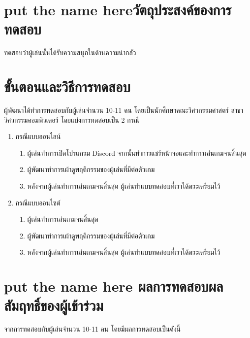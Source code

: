 \section{\ifenglish put the name here\else วัตถุประสงค์ของการทดสอบ\fi}
ทดสอบว่าผู้เล่นนั้นได้รับความสนุกในด้านความน่ากลัว

\section{ขั้นตอนและวิธีการทดสอบ}
ผู้พัฒนาได้ทำการทดสอบกับผู้เล่นจำนวน 10-11 คน โดยเป็นนักศึกษาคณะวิศวกรรมศาสตร์ สาขาวิศวกรรมคอมพิวเตอร์ โดยแบ่งการทดสอบเป็น 2 กรณี
\begin{enumerate}
    \item กรณีแบบออนไลน์
    \begin{enumerate}
        \item ผู้เล่นทำการเปิดโปรแกรม Discord จากนั้นทำการแชร์หน้าจอและทำการเล่นเกมจนสิ้นสุด
        \item ผู้พัฒนาทำการเผ้าดูพฤติกรรมของผู้เล่นที่มีต่อตัวเกม
        \item หลังจากผู้เล่นทำการเล่นเกมจนสิ้นสุด ผู้เล่นทำแบบทดสอบที่เราได้ตระเตรียมไว้
    \end{enumerate}
    \item กรณีแบบออนไซต์
    \begin{enumerate}
        \item ผู้เล่นทำการเล่นเกมจนสิ้นสุด
        \item ผู้พัฒนาทำการเผ้าดูพฤติกรรมของผู้เล่นที่มีต่อตัวเกม
        \item หลังจากผู้เล่นทำการเล่นเกมจนสิ้นสุด ผู้เล่นทำแบบทดสอบที่เราได้ตระเตรียมไว้
    \end{enumerate}
\end{enumerate}

\section{\ifenglish put the name here \else ผลการทดสอบผลสัมฤทธิ์ของผู้เข้าร่วม\fi}
จากการทดสอบกับผู้เล่นจำนวน 10-11 คน โดยมีผลการทดสอบเป็นดังนี้

